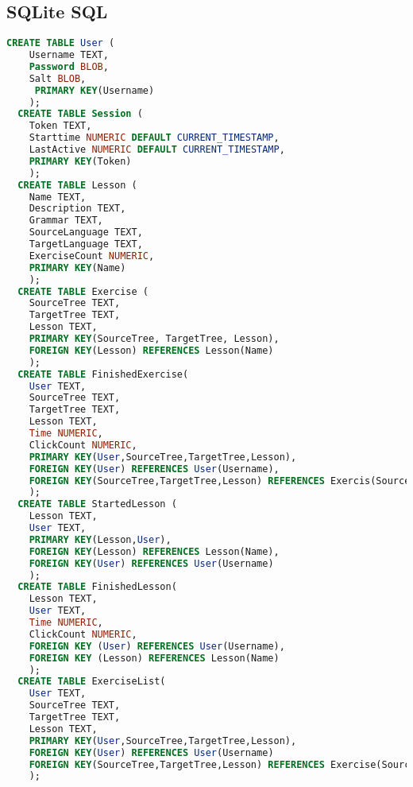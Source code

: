 \documentclass{scrartcl}
\begin{document}
\subsection{SQLite SQL}

\begin{lstlisting}[language=SQL]
  CREATE TABLE User (
    Username TEXT,
    Password BLOB,
    Salt BLOB,
     PRIMARY KEY(Username)
    );
  CREATE TABLE Session (
    Token TEXT,
    Starttime NUMERIC DEFAULT CURRENT_TIMESTAMP,
    LastActive NUMERIC DEFAULT CURRENT_TIMESTAMP,
    PRIMARY KEY(Token)
    );
  CREATE TABLE Lesson (
    Name TEXT,
    Description TEXT,
    Grammar TEXT,
    SourceLanguage TEXT,
    TargetLanguage TEXT,
    ExerciseCount NUMERIC,
    PRIMARY KEY(Name)
    );
  CREATE TABLE Exercise (
    SourceTree TEXT,
    TargetTree TEXT,
    Lesson TEXT,
    PRIMARY KEY(SourceTree, TargetTree, Lesson),
    FOREIGN KEY(Lesson) REFERENCES Lesson(Name)
    );
  CREATE TABLE FinishedExercise(
    User TEXT,
    SourceTree TEXT,
    TargetTree TEXT,
    Lesson TEXT,
    Time NUMERIC,
    ClickCount NUMERIC,
    PRIMARY KEY(User,SourceTree,TargetTree,Lesson),
    FOREIGN KEY(User) REFERENCES User(Username),
    FOREIGN KEY(SourceTree,TargetTree,Lesson) REFERENCES Exercis(SourceTree,TargetTree,Lesson)
    );
  CREATE TABLE StartedLesson (
    Lesson TEXT,
    User TEXT,
    PRIMARY KEY(Lesson,User),
    FOREIGN KEY(Lesson) REFERENCES Lesson(Name),
    FOREIGN KEY(User) REFERENCES User(Username)
    );
  CREATE TABLE FinishedLesson(
    Lesson TEXT,
    User TEXT,
    Time NUMERIC,
    ClickCount NUMERIC,
    FOREIGN KEY (User) REFERENCES User(Username),
    FOREIGN KEY (Lesson) REFERENCES Lesson(Name)
    );
  CREATE TABLE ExerciseList(
    User TEXT,
    SourceTree TEXT,
    TargetTree TEXT,
    Lesson TEXT,
    PRIMARY KEY(User,SourceTree,TargetTree,Lesson),
    FOREIGN KEY(User) REFERENCES User(Username)
    FOREIGN KEY(SourceTree,TargetTree,Lesson) REFERENCES Exercise(SourceTree,TargetTree,Lesson)
    );
\end{lstlisting}
\end{document}
